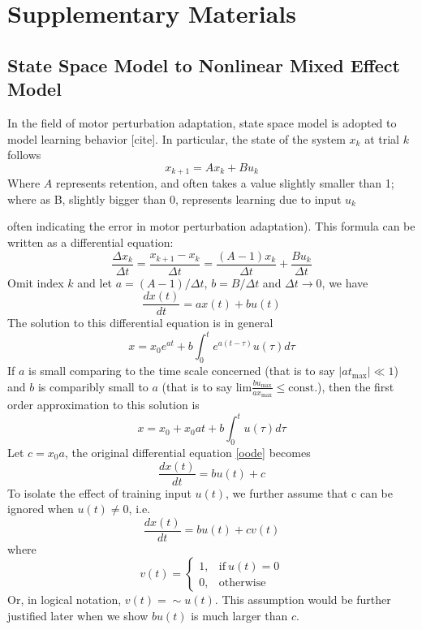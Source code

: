 \section{Supplementary Materials}
\subsection{State Space Model to Nonlinear Mixed Effect Model}\label{sec:SM1}
In the field of motor perturbation adaptation, state space model is adopted to model learning behavior [cite]. 
In particular, the state of the system $ x_k $ at trial $ k $ follows 
\begin{equation}\label{ssm}
x_{k+1} = Ax_k + Bu_k
\end{equation}
Where $ A $ represents retention, and often takes a value slightly smaller than 1; 
where as B, slightly bigger than 0, represents learning due to input $ u_k $ {often indicating the error in motor perturbation adaptation).
	This formula can be written as a differential equation:
	\begin{equation}
	\frac{\Delta x_k}{\Delta t} = \frac{x_{k+1}-x_k}{\Delta t} = \frac{(A-1)x_k}{\Delta t} + \frac{Bu_k}{\Delta t}
	\end{equation}
	Omit index $ k $ and let $ a = (A-1)/\Delta t $, $ b = B/\Delta t $ and $ \Delta t\rightarrow 0 $, we have
	\begin{equation}\label{oode}
	\frac{dx(t)}{dt} = ax(t)+bu(t)
	\end{equation}
	The solution to this differential equation is in general
	\begin{equation}\label{generalsolution}
	x = x_0e^{at} + b\int_0^t e^{a(t-\tau)}u(\tau)d\tau
	\end{equation}
	If $ a $ is small comparing to the time scale concerned (that is to say $ |at_{\text{max}}| \ll 1 $) and $ b $ is comparibly small to $ a $ (that is to say $ \text{lim}\frac{bu_\text{max}}{ax_\text{max}} \leqslant \text{const.} $), then the first order approximation to this solution is
	\begin{equation}\label{specialsolution}
	x = x_0 + x_0at + b \int_0^t u(\tau)d\tau
	\end{equation}
	Let $ c=x_0 a $, the original differential equation \ref{oode} becomes
	\begin{equation}
	\frac{dx(t)}{dt} = bu(t) + c
	\end{equation}
	To isolate the effect of training input $ u(t) $, we further assume that c can be ignored when $ u(t) \neq 0 $, i.e.
	\begin{equation}\label{eqn:finalode2}
	\frac{dx(t)}{dt} = bu(t) + cv(t)
	\end{equation}
	where
	\begin{equation}
	v(t) = 
	\begin{cases}
	1, & \text{if}\ u(t) = 0 \\
	0, & \text{otherwise}
	\end{cases}
	\end{equation}
	Or, in logical notation, $ v(t) = \sim u(t) $. 
	This assumption would be further justified later when we show $ bu(t) $ is much larger than $ c $.
	
}
